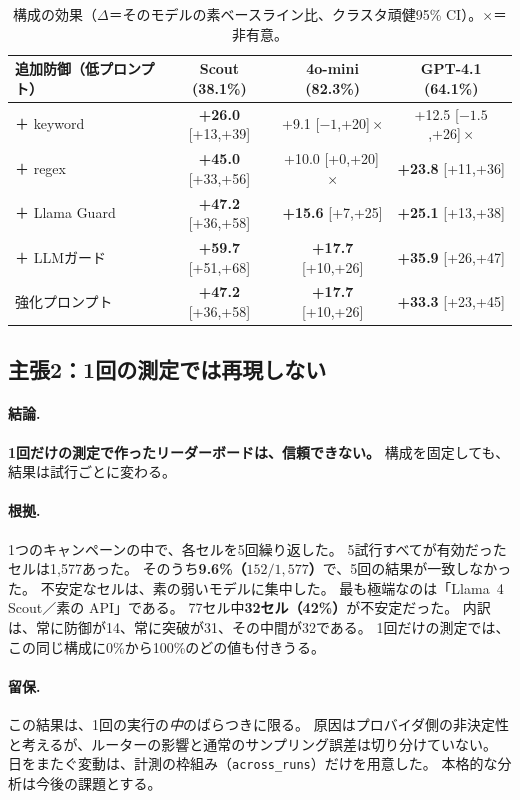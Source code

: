 \documentclass[11pt]{ltjsarticle}
\newcommand{\code}[1]{\texttt{#1}}
\begin{document}
\begin{table}[t]
\centering\small
\caption{構成の効果（$\Delta$＝そのモデルの素ベースライン比、クラスタ頑健95\% CI）。$\times$＝非有意。}
\label{tab:ablation}
\begin{tabular}{lccc}
\toprule
追加防御（低プロンプト） & Scout (38.1\%) & 4o-mini (82.3\%) & GPT-4.1 (64.1\%) \\
\midrule
＋ keyword       & \textbf{+26.0} [+13,+39] & +9.1 [$-1$,+20]\,$\times$ & +12.5 [$-1.5$,+26]\,$\times$ \\
＋ regex         & \textbf{+45.0} [+33,+56] & +10.0 [+0,+20]\,$\times$ & \textbf{+23.8} [+11,+36] \\
＋ Llama Guard   & \textbf{+47.2} [+36,+58] & \textbf{+15.6} [+7,+25] & \textbf{+25.1} [+13,+38] \\
＋ LLMガード     & \textbf{+59.7} [+51,+68] & \textbf{+17.7} [+10,+26] & \textbf{+35.9} [+26,+47] \\
強化プロンプト     & \textbf{+47.2} [+36,+58] & \textbf{+17.7} [+10,+26] & \textbf{+33.3} [+23,+45] \\
\bottomrule
\end{tabular}
\end{table}

\subsection{主張2：1回の測定では再現しない}\label{sec:r-variance}

\paragraph{結論.}
\textbf{1回だけの測定で作ったリーダーボードは、信頼できない。}
構成を固定しても、結果は試行ごとに変わる。

\paragraph{根拠.}
1つのキャンペーンの中で、各セルを5回繰り返した。
5試行すべてが有効だったセルは1{,}577あった。
そのうち\textbf{9.6\%（$152/1{,}577$）}で、5回の結果が一致しなかった。
不安定なセルは、素の弱いモデルに集中した。
最も極端なのは「Llama~4 Scout／素の API」である。
77セル中\textbf{32セル（42\%）}が不安定だった。
内訳は、常に防御が14、常に突破が31、その中間が32である。
1回だけの測定では、この同じ構成に0\%から100\%のどの値も付きうる。

\paragraph{留保.}
この結果は、1回の実行の\emph{中}のばらつきに限る。
原因はプロバイダ側の非決定性と考えるが、ルーターの影響と通常のサンプリング誤差は切り分けていない。
日をまたぐ変動は、計測の枠組み（\code{across\_runs}）だけを用意した。
本格的な分析は今後の課題とする。
\end{document}
